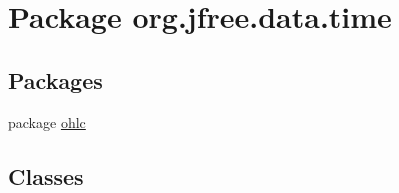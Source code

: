 \hypertarget{namespaceorg_1_1jfree_1_1data_1_1time}{}\section{Package org.\+jfree.\+data.\+time}
\label{namespaceorg_1_1jfree_1_1data_1_1time}
\subsection*{Packages}
\begin{DoxyCompactItemize}
\item 
package \mbox{\hyperlink{namespaceorg_1_1jfree_1_1data_1_1time_1_1ohlc}{ohlc}}
\end{DoxyCompactItemize}
\subsection*{Classes}
